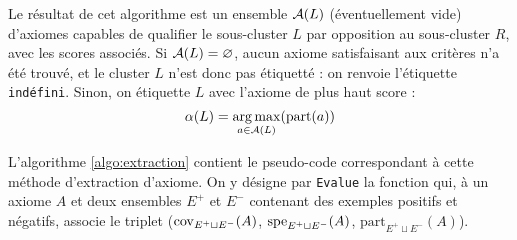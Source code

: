 Le résultat de cet algorithme est un ensemble $\cal{A}(L)$ (éventuellement vide) d'axiomes capables de qualifier le sous-cluster $L$ par opposition au sous-cluster $R$, avec les scores associés. Si $\cal{A}(L) = \varnothing$, aucun axiome satisfaisant aux critères n'a été trouvé, et le cluster $L$ n'est donc pas étiquetté : on renvoie l'étiquette \texttt{indéfini}. Sinon, on étiquette $L$ avec l'axiome de plus haut score :
\begin{equation}
    \alpha(L) = \argmax_{a \in \cal{A}(L)}(\text{part}(a))
\end{equation}

L'algorithme \ref{algo:extraction} contient le pseudo-code correspondant à cette méthode d'extraction d'axiome. On y désigne par \texttt{Evalue} la fonction qui, à un axiome $A$ et deux ensembles $E^+$ et $E^-$ contenant des exemples positifs et négatifs, associe le triplet ($\cov_{E^+ \sqcup E^-}(A)$, $\spe_{E^+ \sqcup E^-}(A)$, $\textrm{part}_{E^+ \sqcup E^-}(A)$).


